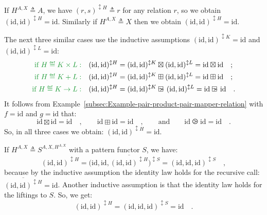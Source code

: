 If $H^{A,X}\triangleq A$, we have $(r,s)^{\updownarrow H}\triangleq r$
for any relation $r$, so we obtain $(\text{id},\text{id})^{\updownarrow H}=\text{id}$.
Similarly if $H^{A,X}\triangleq X$ then we obtain $(\text{id},\text{id})^{\updownarrow H}=\text{id}$.

The next three similar cases use the inductive assumptions $(\text{id},\text{id})^{\updownarrow K}=\text{id}$
and $(\text{id},\text{id})^{\updownarrow L}=\text{id}$:
\begin{align*}
{\color{greenunder}\text{if }H\triangleq K\times L:}\quad & (\text{id},\text{id})^{\updownarrow H}=(\text{id},\text{id})^{\updownarrow K}\boxtimes(\text{id},\text{id})^{\updownarrow L}=\text{id}\boxtimes\text{id}\quad;\\
{\color{greenunder}\text{if }H\triangleq K+L:}\quad & (\text{id},\text{id})^{\updownarrow H}=(\text{id},\text{id})^{\updownarrow K}\boxplus(\text{id},\text{id})^{\updownarrow L}=\text{id}\boxplus\text{id}\quad;\\
{\color{greenunder}\text{if }H\triangleq K\rightarrow L:}\quad & (\text{id},\text{id})^{\updownarrow H}=(\text{id},\text{id})^{\updownarrow K}\ogreaterthan(\text{id},\text{id})^{\updownarrow L}=\text{id}\ogreaterthan\text{id}\quad.
\end{align*}
It follows from Example~\ref{subsec:Example-pair-product-pair-mapper-relation}
with $f=\text{id}$ and $g=\text{id}$ that:
\[
\text{id}\boxtimes\text{id}=\text{id}\quad,\quad\quad\text{id}\boxplus\text{id}=\text{id}\quad,\quad\quad\text{and}\quad\quad\text{id}\ogreaterthan\text{id}=\text{id}\quad.
\]
So, in all three cases we obtain: $(\text{id},\text{id})^{\updownarrow H}=\text{id}$.

If $H^{A,X}\triangleq S^{A,X,H^{A,X}}$ with a pattern functor $S$,
we have:
\[
(\text{id},\text{id})^{\updownarrow H}=\big(\text{id},\text{id},\overline{(\text{id},\text{id})^{\updownarrow H}}\big)^{\updownarrow S}=(\text{id},\text{id},\text{id})^{\updownarrow S}\quad,
\]
because by the inductive assumption the identity law holds for the
recursive call: $\overline{(\text{id},\text{id})^{\updownarrow H}}=\text{id}$.
Another inductive assumption is that the identity law holds for the
liftings to $S$. So, we get: 
\[
(\text{id},\text{id})^{\updownarrow H}=(\text{id},\text{id},\text{id})^{\updownarrow S}=\text{id}\quad.
\]

